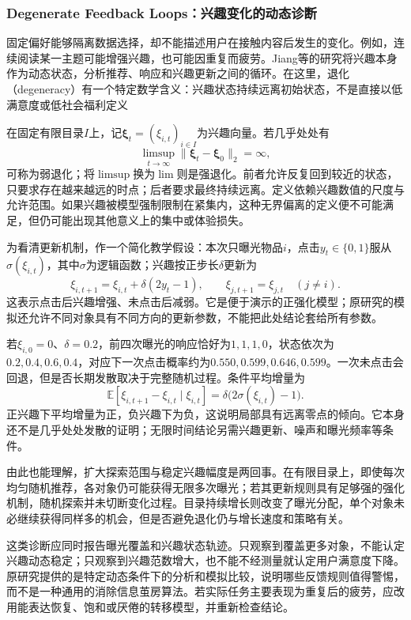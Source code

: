 \Needspace{100mm}
\subsubsection{Degenerate Feedback Loops：兴趣变化的动态诊断}
\label{sec:rs-degenerate-feedback}

固定偏好能够隔离数据选择，却不能描述用户在接触内容后发生的变化。例如，连续阅读某一主题可能增强兴趣，也可能因重复而疲劳。Jiang等的研究将兴趣本身作为动态状态，分析推荐、响应和兴趣更新之间的循环。在这里，退化（degeneracy）有一个特定数学含义：兴趣状态持续远离初始状态，不是直接以低满意度或低社会福利定义

在固定有限目录$I$上，记$\bm{\xi}_t=(\xi_{i,t})_{i\in I}$为兴趣向量。若几乎处处有
\[
 \limsup_{t\to\infty}
 \lVert\bm{\xi}_t-\bm{\xi}_0\rVert_2=\infty,
\]
可称为弱退化；将$\limsup$换为$\lim$则是强退化。前者允许反复回到较近的状态，只要求存在越来越远的时点；后者要求最终持续远离。定义依赖兴趣数值的尺度与允许范围。如果兴趣被模型强制限制在紧集内，这种无界偏离的定义便不可能满足，但仍可能出现其他意义上的集中或体验损失。

为看清更新机制，作一个简化教学假设：本次只曝光物品$i$，点击$y_t\in\{0,1\}$服从$\sigma(\xi_{i,t})$，其中$\sigma$为逻辑函数；兴趣按正步长$\delta$更新为
\begin{equation}
 \xi_{i,t+1}=\xi_{i,t}+\delta(2y_t-1),
 \qquad
 \xi_{j,t+1}=\xi_{j,t}\quad(j\ne i).
 \label{eq:rs-interest-reinforcement}
\end{equation}
这表示点击后兴趣增强、未点击后减弱。它是便于演示的正强化模型；原研究的模拟还允许不同对象具有不同方向的更新参数，不能把此处结论套给所有参数。

若$\xi_{i,0}=0$、$\delta=0.2$，前四次曝光的响应恰好为$1,1,1,0$，状态依次为$0.2,0.4,0.6,0.4$，对应下一次点击概率约为$0.550,0.599,0.646,0.599$。一次未点击会回退，但是否长期发散取决于完整随机过程。条件平均增量为
\[
 \mathbb{E}[\xi_{i,t+1}-\xi_{i,t}\mid\xi_{i,t}]
 =\delta\bigl(2\sigma(\xi_{i,t})-1\bigr).
\]
正兴趣下平均增量为正，负兴趣下为负，这说明局部具有远离零点的倾向。它本身还不是几乎处处发散的证明；无限时间结论另需兴趣更新、噪声和曝光频率等条件。

由此也能理解，扩大探索范围与稳定兴趣幅度是两回事。在有限目录上，即使每次均匀随机推荐，各对象仍可能获得无限多次曝光；若其更新规则具有足够强的强化机制，随机探索并未切断变化过程。目录持续增长则改变了曝光分配，单个对象未必继续获得同样多的机会，但是否避免退化仍与增长速度和策略有关。

这类诊断应同时报告曝光覆盖和兴趣状态轨迹。只观察到覆盖更多对象，不能认定兴趣动态稳定；只观察到兴趣范数增大，也不能不经测量就认定用户满意度下降。原研究提供的是特定动态条件下的分析和模拟比较，说明哪些反馈规则值得警惕，而不是一种通用的消除信息茧房算法。若实际任务主要表现为重复后的疲劳，应改用能表达恢复、饱和或厌倦的转移模型，并重新检查结论。

